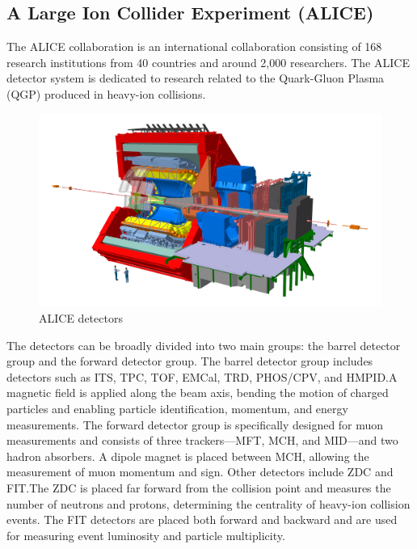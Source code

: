         \subsection{A Large Ion Collider Experiment (ALICE)}
        The ALICE collaboration is an international collaboration consisting of 168 research institutions from 40 countries and around 2,000 researchers. The ALICE detector system is dedicated to research related to the Quark-Gluon Plasma (QGP) produced in heavy-ion collisions.
        \begin{figure}[htbp]
            \centering
            \includegraphics[keepaspectratio, scale=0.2]{fig/2_1_ALICE_RUN3_detectors.jpg}
            \caption{ALICE detectors}
            \label{ALICE_detectors}
        \end{figure}
        The detectors can be broadly divided into two main groups: the barrel detector group and the forward detector group.
        The barrel detector group includes detectors such as ITS, TPC, TOF, EMCal, TRD, PHOS/CPV, and HMPID.\@ A magnetic field is applied along the beam axis, bending the motion of charged particles and enabling particle identification, momentum, and energy measurements. The forward detector group is specifically designed for muon measurements and consists of three trackers—MFT, MCH, and MID—and two hadron absorbers. A dipole magnet is placed between MCH, allowing the measurement of muon momentum and sign. Other detectors include ZDC and FIT.\@ The ZDC is placed far forward from the collision point and measures the number of neutrons and protons, determining the centrality of heavy-ion collision events. The FIT detectors are placed both forward and backward and are used for measuring event luminosity and particle multiplicity.

